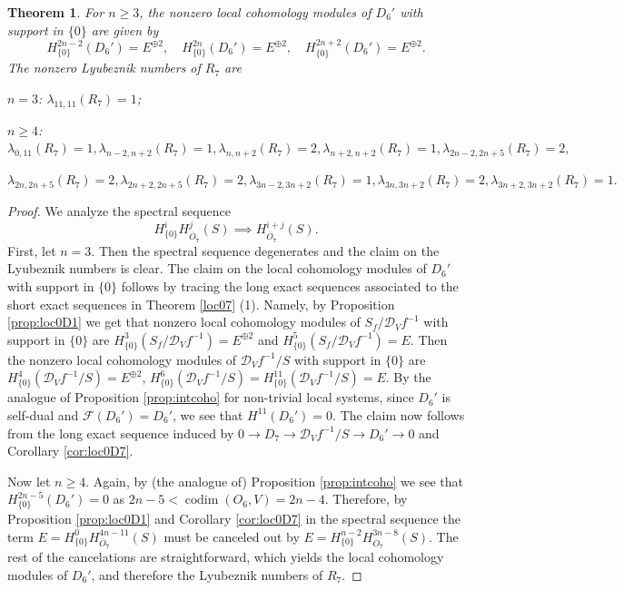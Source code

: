 \documentclass[11pt,reqno]{amsart}
\newcommand{\D}{\mathcal{D}}
\newcommand{\mc}[1]{\mathcal{#1}}
\newcommand{\ol}[1]{\overline{#1}}
\newcommand{\op}[1]{\operatorname{#1}}
\newtheorem{theorem}{Theorem}[section]
\numberwithin{equation}{section}
\begin{document}
\begin{theorem}
For $n\geq 3$, the nonzero local cohomology modules of $D_6'$ with support in $\{0\}$ are given by	
$$
H^{2n-2}_{\{0\}}(D_6')=E^{\oplus 2},\quad H^{2n}_{\{0\}}(D_6')=E^{\oplus 2},\quad H^{2n+2}_{\{0\}}(D_6')=E^{\oplus 2}.
$$
The nonzero Lyubeznik numbers of $R_7$ are
\item[(a)] $n=3$: $\lambda_{11,11}(R_7)= 1$; 
\item[(b)] $n\geq 4$: $\lambda_{0,11}(R_7) =1 , \lambda_{n-2,n+2}(R_7) = 1, \lambda_{n,n+2}(R_7)=2, \lambda_{n+2,n+2}(R_7)=1, \lambda_{2n-2,2n+5}(R_7)=2,$ 

$\lambda_{2n,2n+5}(R_7)=2, \lambda_{2n+2,2n+5}(R_7)=2, \lambda_{3n-2,3n+2}(R_7)=1, \lambda_{3n,3n+2}(R_7)=2, \lambda_{3n+2,3n+2}(R_7)=1.$
\end{theorem}

\begin{proof}
We analyze the spectral sequence 
\[H^i_{\{0\}} H^j_{\ol{O}_7} (S) \implies H^{i+j}_{\ol{O}_7}(S).\]
First, let $n=3$. Then the spectral sequence degenerates and the claim on the Lyubeznik numbers is clear. The claim on the local cohomology modules of $D_6'$ with support in $\{0\}$ follows by tracing the long exact sequences associated to the short exact sequences in Theorem \ref{loc07} (1). Namely, by Proposition \ref{prop:loc0D1} we get that nonzero local cohomology modules of $S_f/\D_Vf^{-1}$ with support in $\{0\}$ are $H^3_{\{0\}}(S_f/\D_Vf^{-1})=E^{\oplus 2}$ and $H^5_{\{0\}}(S_f/\D_Vf^{-1})=E$. Then the nonzero local cohomology modules of $\D_Vf^{-1}/S$ with support in $\{0\}$ are $H^4_{\{0\}}(\D_Vf^{-1}/S)=E^{\oplus 2}$, $H^6_{\{0\}}(\D_Vf^{-1}/S)=H^{11}_{\{0\}}(\D_Vf^{-1}/S)=E$. By the analogue of Proposition \ref{prop:intcoho} for non-trivial local systems, since $D_6'$ is self-dual and $\mc{F}(D_6')=D_6'$, we see that $H^{11}(D_6')=0$. The claim now follows from the long exact sequence induced by $0\to D_7 \to \D_Vf^{-1}/S \to D_6'\to 0$ and Corollary \ref{cor:loc0D7}.

Now let $n\geq 4$. Again, by (the analogue of) Proposition \ref{prop:intcoho} we see that $H_{\{0\}}^{2n-5}(D_6') = 0$ as $2n-5 < \op{codim}(O_6, V)=2n-4$. Therefore, by Proposition \ref{prop:loc0D1} and Corollary \ref{cor:loc0D7} in the spectral sequence the term $E=H^0_{\{0\}} H^{4n-11}_{\ol{O}_7}(S)$ must be canceled out by $E=H^{n-2}_{\{0\}} H^{3n-8}_{\ol{O}_7}(S)$. The rest of the cancelations are straightforward, which yields the local cohomology modules of $D_6'$, and therefore the Lyubeznik numbers of $R_7$.
\end{proof}
\end{document}
